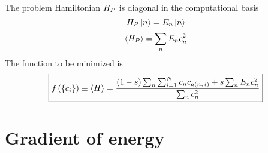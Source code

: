 The problem Hamiltonian $H_P$ is diagonal in the computational basis
\begin{equation}
  H_P \left| n \right> = E_n \left| n \right>
  \label{}
\end{equation}
\begin{equation}
  \left< H_P \right> = \sum_n E_n c_n^2
  \label{}
\end{equation}
The function to be minimized is
\begin{equation}
  \boxed{
  f \left( \left\{ c_i \right\} \right)
  \equiv \left< H \right>
  = \frac{(1-s) \sum_n \sum_{i=1}^N c_n c_{a(n,\,i)} + s \sum_n E_n c_n^2}
  {\sum_n c_n^2}
  }
  \label{}
\end{equation}
\section*{Gradient of energy}


